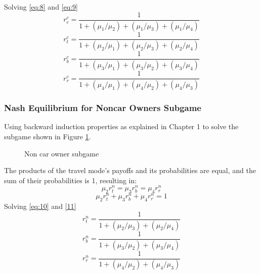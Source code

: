 Solving \ref{eq:8} and \ref{eq:9}
\begin{equation}\label{eq:5555}
r^c_{c} = \frac{1}{1+ (\mu_1 / \mu_2)+(\mu_1 / \mu_3)+(\mu_1 / \mu_4)}
\end{equation}
\begin{equation}
r^c_{t} = \frac{1}{1+ (\mu_2 / \mu_1)+(\mu_2 / \mu_3)+(\mu_2 / \mu_4)}
\end{equation}
\begin{equation}
r^c_{b} = \frac{1}{1+ (\mu_3 / \mu_1)+(\mu_3 / \mu_2)+(\mu_3 / \mu_4)}
\end{equation}
\begin{equation}
r^c_{r} = \frac{1}{1+ (\mu_4 / \mu_1)+(\mu_4 / \mu_2)+(\mu_4 / \mu_3)}
\end{equation}

\subsubsection{Nash Equilibrium for Noncar Owners Subgame}
Using backward induction properties as explained in Chapter 1 to solve the subgame shown in Figure \ref{fig:4}. \\

\begin{figure}[!h]
  \centering
  \caption{Non car owner subgame\label{fig:4}}
\end{figure}
The products of the travel mode's payoffs and its probabilities are equal, and the sum of their probabilities is 1, resulting in: 
\begin{equation}\label{eq:10}
\mu_2 r^n_{t} = \mu_3 r^n_{b} = \mu_4 r^n_{r}
\end{equation}
\begin{equation}\label{11}
\mu_2 r^n_{t} + \mu_3 r^n_{b} + \mu_4 r^n_{r} = 1
\end{equation}
Solving \ref{eq:10} and \ref{11} 
\begin{equation}
r^n_{t} = \frac{1}{1+(\mu_2 / \mu_3)+(\mu_2 / \mu_4)}
\end{equation}
\begin{equation}
r^n_{b} = \frac{1}{1+ (\mu_3 / \mu_2)+(\mu_3 / \mu_4)}
\end{equation}
\begin{equation}\label{eq:666}
r^n_{r} = \frac{1}{1+ (\mu_4 / \mu_2)+(\mu_4 / \mu_3)}
\end{equation}
